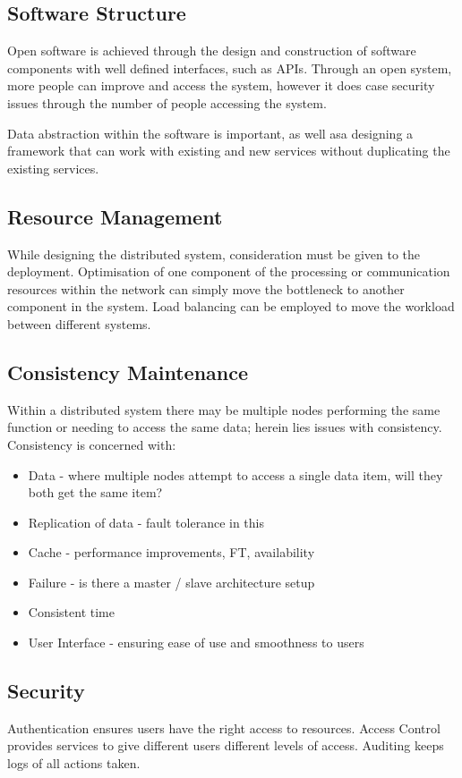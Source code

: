 \subsection{Software Structure}
Open software is achieved through the design and construction of software components with well defined interfaces, such as APIs. Through an open system, more people can improve and access the system, however it does case security issues through the number of people accessing the system.

Data abstraction within the software is important, as well asa designing a framework that can work with existing and new services without duplicating the existing services.

\subsection{Resource Management}
While designing the distributed system, consideration must be given to the deployment. Optimisation of one component of the processing or communication resources within the network can simply move the bottleneck to another component in the system. Load balancing can be employed to move the workload between different systems. 

\subsection{Consistency Maintenance}
Within a distributed system there may be multiple nodes performing the same function or needing to access the same data; herein lies issues with consistency. Consistency is concerned with:
\begin{itemize}
    \item Data - where multiple nodes attempt to access a single data item, will they both get the same item?
    \item Replication of data - fault tolerance in this
    \item Cache - performance improvements, FT, availability
    \item Failure - is there a master / slave architecture setup
    \item Consistent time
    \item User Interface - ensuring ease of use and smoothness to users
\end{itemize}

\subsection{Security}
Authentication ensures users have the right access to resources. Access Control provides services to give different users different levels of access. Auditing keeps logs of all actions taken. 